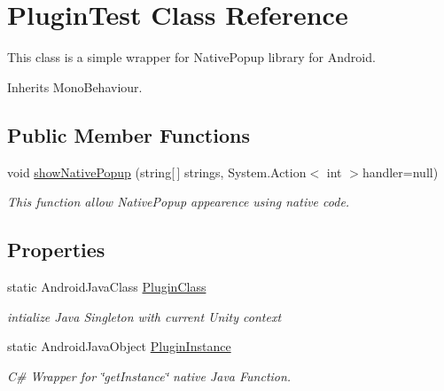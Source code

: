 \hypertarget{class_plugin_test}{}\section{Plugin\+Test Class Reference}
\label{class_plugin_test}


This class is a simple wrapper for Native\+Popup library for Android.  




Inherits Mono\+Behaviour.

\subsection*{Public Member Functions}
\begin{DoxyCompactItemize}
\item 
void \mbox{\hyperlink{class_plugin_test_a33a2f4883cdfbb97570fa67a69d15e6c}{show\+Native\+Popup}} (string\mbox{[}$\,$\mbox{]} strings, System.\+Action$<$ int $>$handler=null)
\begin{DoxyCompactList}\small\item\em This function allow Native\+Popup appearence using native code. \end{DoxyCompactList}\end{DoxyCompactItemize}
\subsection*{Properties}
\begin{DoxyCompactItemize}
\item 
static Android\+Java\+Class \mbox{\hyperlink{class_plugin_test_af0c0706dc0b8b8cf2dd3f834b8c99e5d}{Plugin\+Class}}
\begin{DoxyCompactList}\small\item\em intialize Java Singleton with current Unity context \end{DoxyCompactList}\item 
static Android\+Java\+Object \mbox{\hyperlink{class_plugin_test_adff2a11b1757e5e5bdf992942fe66daa}{Plugin\+Instance}}
\begin{DoxyCompactList}\small\item\em C\# Wrapper for \char`\"{}get\+Instance\char`\"{} native Java Function. \end{DoxyCompactList}\end{DoxyCompactItemize}


